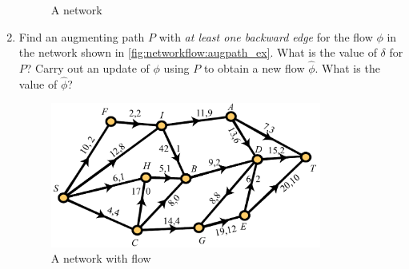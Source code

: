 \begin{enumerate}
\begin{figure}
    \caption{A network}
    \label{fig:networkflow:network_ex}
  \end{figure}
\item Find an augmenting path $P$ with \emph{at least one backward edge}
  for the flow $\phi$ in the network shown in
  \autoref{fig:networkflow:augpath_ex}. What is the value of $\delta$
  for $P$? Carry out an update of $\phi$ using $P$ to obtain a new
  flow $\hat{\phi}$. What is the value of $\hat{\phi}$?
  \begin{figure}
    \centering
    \includegraphics[width=3.5in]{networkflow-figs/augpath_ex}
    \caption{A network with flow}
    \label{fig:networkflow:augpath_ex}
  \end{figure}


\end{enumerate}
